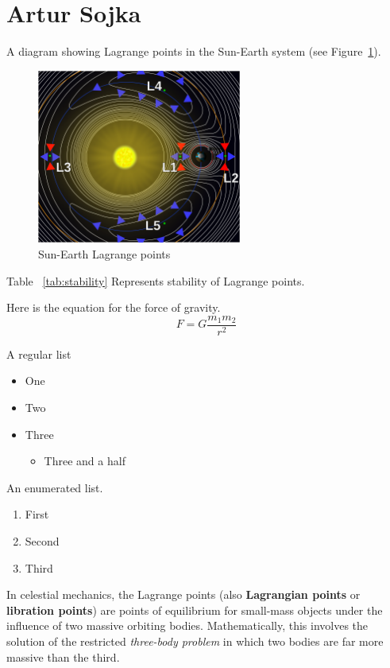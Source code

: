 \section{Artur Sojka}
\label{sec:artsoj}

A diagram showing Lagrange points in the Sun-Earth system (see Figure~\ref{fig:points}).

\begin{figure}[htbp]
    \centering
    \includegraphics[width=0.6\textwidth]{pictures/Lagrange_points.png}
    \caption{Sun-Earth Lagrange points}
    \label{fig:points}
\end{figure}

Table ~\ref{tab:stability} Represents stability of Lagrange points.



Here is the equation for the force of gravity. \[F=G\frac{m_1m_2}{r^2}\]

A regular list
\begin{itemize}
    \item One
    \item Two
    \item Three
    \begin{itemize}
        \item Three and a half
    \end{itemize}
\end{itemize}

\begin{samepage}
An enumerated list.
\begin{enumerate}
    \item First
    \item Second
    \item Third
\end{enumerate}
\end{samepage}
\vspace{0.5cm}
In celestial mechanics, the Lagrange points (also \textbf{Lagrangian points} or \textbf{libration points}) are points of equilibrium for small-mass objects under the influence of two massive orbiting bodies. Mathematically, this involves the solution of the restricted \emph{three-body problem} in which two bodies are far more massive than the third.

